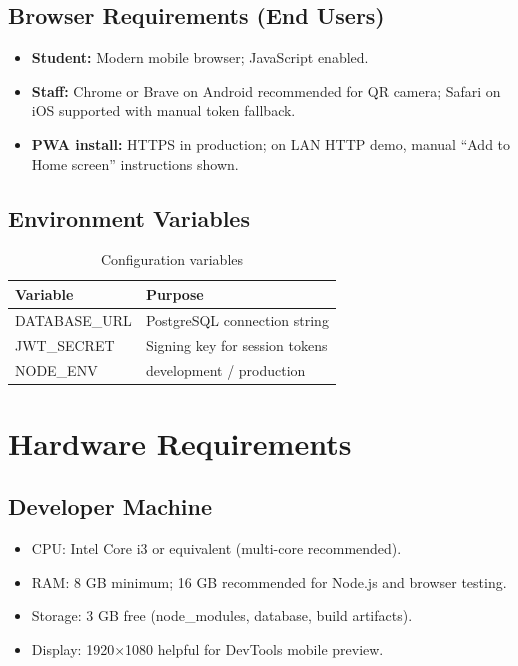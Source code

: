 \subsection{Browser Requirements (End Users)}
\begin{itemize}
  \item \textbf{Student:} Modern mobile browser; JavaScript enabled.
  \item \textbf{Staff:} Chrome or Brave on Android recommended for QR camera; Safari on iOS supported with manual token fallback.
  \item \textbf{PWA install:} HTTPS in production; on LAN HTTP demo, manual ``Add to Home screen'' instructions shown.
\end{itemize}

\subsection{Environment Variables}
\begin{table}[H]
  \centering
  \caption{Configuration variables}
  \tablebodysetup
  \begin{tabularx}{\textwidth}{@{}l Y@{}}
    \toprule
    \textbf{Variable} & \textbf{Purpose} \\
    \midrule
    DATABASE\_URL & PostgreSQL connection string \\
    JWT\_SECRET & Signing key for session tokens \\
    NODE\_ENV & development / production \\
    \bottomrule
  \end{tabularx}
\end{table}

\section{Hardware Requirements}

\subsection{Developer Machine}
\begin{itemize}
  \item CPU: Intel Core i3 or equivalent (multi-core recommended).
  \item RAM: 8 GB minimum; 16 GB recommended for Node.js and browser testing.
  \item Storage: 3 GB free (node\_modules, database, build artifacts).
  \item Display: 1920$\times$1080 helpful for DevTools mobile preview.
\end{itemize}

